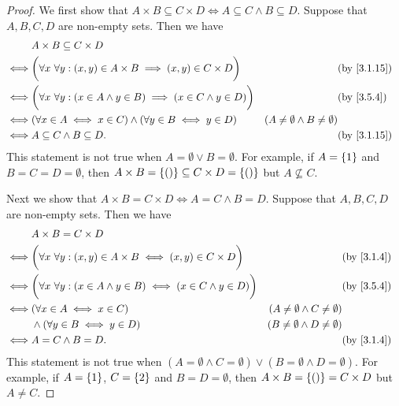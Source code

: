 \begin{proof}
	We first show that \(A \times B \subseteq C \times D \iff A \subseteq C \land B \subseteq D\).
	Suppose that \(A, B, C, D\) are non-empty sets.
	Then we have
	\begin{align*}
		     & A \times B \subseteq C \times D                                                                                                                       \\
		\iff & \bigg(\forall x \ \forall y : (x, y) \in A \times B \implies (x, y) \in C \times D\bigg)    &                                           & \by{3.1.15} \\
		\iff & \bigg(\forall x \ \forall y :(x \in A \land y \in B) \implies (x \in C \land y \in D)\bigg) &                                           & \by{3.5.4}  \\
		\iff & (\forall x \in A \iff x \in C) \land (\forall y \in B \iff y \in D)                         & (A \neq \emptyset \land B \neq \emptyset)               \\
		\iff & A \subseteq C \land B \subseteq D.                                                          &                                           & \by{3.1.15}
	\end{align*}
	This statement is not true when \(A = \emptyset \lor B = \emptyset\).
	For example, if \(A = \left\lbrace1\right\rbrace\) and \(B = C = D = \emptyset\), then \(A \times B = \left\lbrace()\right\rbrace \subseteq C \times D = \left\lbrace()\right\rbrace\) but \(A \not \subseteq C\).

	Next we show that \(A \times B = C \times D \iff A = C \land B = D\).
	Suppose that \(A, B, C, D\) are non-empty sets.
	Then we have
	\begin{align*}
		     & A \times B = C \times D                                                                                                                           \\
		\iff & \bigg(\forall x \ \forall y : (x, y) \in A \times B \iff (x, y) \in C \times D\bigg)     &                                           & \by{3.1.4} \\
		\iff & \bigg(\forall x \ \forall y : (x \in A \land y \in B) \iff (x \in C \land y \in D)\bigg) &                                           & \by{3.5.4} \\
		\iff & (\forall x \in A \iff x \in C)                                                           & (A \neq \emptyset \land C \neq \emptyset)              \\
		     & \land (\forall y \in B \iff y \in D)                                                     & (B \neq \emptyset \land D \neq \emptyset)              \\
		\iff & A = C \land B = D.                                                                       &                                           & \by{3.1.4}
	\end{align*}
	This statement is not true when \((A = \emptyset \land C = \emptyset) \lor (B = \emptyset \land D = \emptyset)\).
	For example, if \(A = \left\lbrace1\right\rbrace\), \(C = \left\lbrace2\right\rbrace\) and \(B = D = \emptyset\), then \(A \times B = \left\lbrace()\right\rbrace = C \times D\) but \(A \neq C\).
\end{proof}

